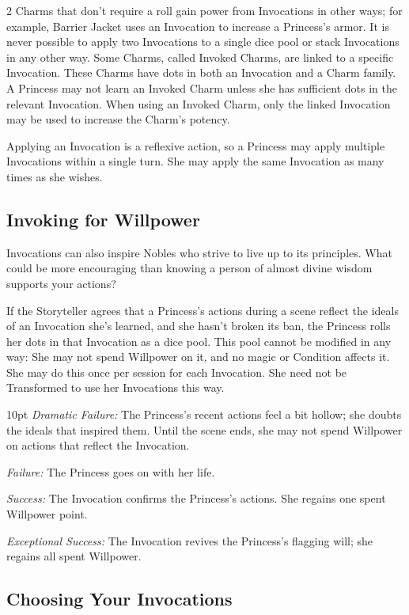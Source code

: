 \begin{multicols}{2}
Charms that don't require a roll gain power from Invocations in other ways; for example, Barrier Jacket uses an Invocation to increase a Princess's armor. It is never possible to apply two Invocations to a single dice pool or stack Invocations in any other way. Some Charms, called Invoked Charms, are linked to a specific Invocation. These Charms have dots in both an Invocation and a Charm family. A Princess may not learn an Invoked Charm unless she has sufficient dots in the relevant Invocation. When using an Invoked Charm, only the linked Invocation may be used to increase the Charm's potency. 

Applying an Invocation is a reflexive action, so a Princess may apply multiple Invocations within a single turn. She may apply the same Invocation as many times as she wishes.

\subsection*{Invoking for Willpower}

Invocations can also inspire Nobles who strive to live up to its principles. What could be more encouraging than knowing a person of almost divine wisdom supports your actions? 

If the Storyteller agrees that a Princess's actions during a scene reflect the ideals of an Invocation she's learned, and she hasn’t broken its ban, the Princess rolls her dots in that Invocation as a dice pool. This pool cannot be modified in any way: She may not spend Willpower on it, and no magic or Condition affects it. She may do this once per session for each Invocation. She need not be Transformed to use her Invocations this way.
 
 \begin{myindentpar}{10pt}
    \emph{Dramatic Failure:} The Princess’s recent actions feel a bit hollow; she doubts the ideals that inspired them. Until the scene ends, she may not spend Willpower on actions that reflect the Invocation.

    \emph{Failure:} The Princess goes on with her life.

    \emph{Success:} The Invocation confirms the Princess’s actions. She regains one spent Willpower point.

    \emph{Exceptional Success:} The Invocation revives the Princess’s flagging will; she regains all spent Willpower.
\end{myindentpar}

\subsection*{Choosing Your Invocations}


\end{multicols}
